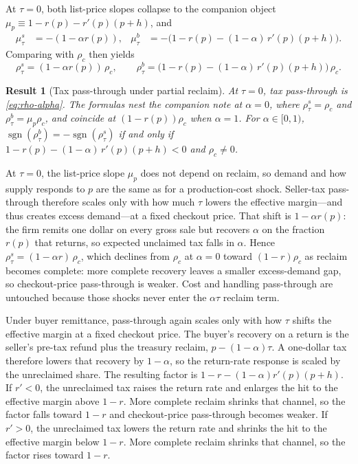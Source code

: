 \documentclass[11pt]{article}
\newtheorem{result}{Result}
\begin{document}
At $\tau=0$, both list-price slopes collapse to the companion object
$\mu_p\equiv 1-r(p)-r'(p)(p+h)$, and
\begin{align}
  \mu^{s}_{\tau}
  &= -(1-\alpha r(p)),
  &
  \mu^{b}_{\tau}
  &= -\bigl(1-r(p)-(1-\alpha)\,r'(p)(p+h)\bigr).
  \label{eq:mu-tau-alpha}
\end{align}
Comparing with $\rho_c$ then yields
\begin{equation}
  \rho^{s}_{\tau}
  = (1-\alpha r(p))\,\rho_c,
  \qquad
  \rho^{b}_{\tau}
  = \bigl(1-r(p)-(1-\alpha)\,r'(p)(p+h)\bigr)\,\rho_c.
  \label{eq:rho-alpha}
\end{equation}
\begin{result}[Tax pass-through under partial reclaim]
\label{res:rho-alpha}
  At $\tau=0$, tax pass-through is \eqref{eq:rho-alpha}.  The formulas nest the
  companion note at $\alpha=0$, where $\rho^{s}_{\tau}=\rho_c$ and
  $\rho^{b}_{\tau}=\mu_p\rho_c$, and coincide at $(1-r(p))\rho_c$ when
  $\alpha=1$.  For $\alpha\in[0,1)$,
  $\operatorname{sgn}(\rho^{b}_{\tau})=-\operatorname{sgn}(\rho^{s}_{\tau})$
  if and only if $1-r(p)-(1-\alpha)\,r'(p)(p+h)<0$ and $\rho_c\neq 0$.
\end{result}
At $\tau=0$, the list-price slope $\mu_p$ does not depend on reclaim, so
demand and how supply responds to $p$ are the same as for a production-cost
shock.  Seller-tax pass-through therefore scales only with how much $\tau$
lowers the effective margin---and thus creates excess demand---at a fixed
checkout price.  That shift is $1-\alpha r(p)$: the firm remits one dollar on
every gross sale but recovers $\alpha$ on the fraction $r(p)$ that returns, so
expected unclaimed tax falls in $\alpha$.  Hence
$\rho^{s}_{\tau}=(1-\alpha r)\,\rho_c$, which declines from $\rho_c$ at
$\alpha=0$ toward $(1-r)\rho_c$ as reclaim becomes complete: more complete
recovery leaves a smaller excess-demand gap, so checkout-price pass-through is
weaker.  Cost and handling pass-through are untouched because those shocks
never enter the $\alpha\tau$ reclaim term.

Under buyer remittance, pass-through again scales only with how $\tau$
shifts the effective margin at a fixed checkout price.  The buyer's recovery
on a return is the seller's pre-tax refund plus the treasury reclaim,
$p-(1-\alpha)\tau$.  A one-dollar tax therefore lowers that recovery by
$1-\alpha$, so the return-rate response is scaled by the unreclaimed share.
The resulting factor is $1-r-(1-\alpha)r'(p)(p+h)$.
If $r'<0$, the unreclaimed tax raises the return rate and enlarges the hit to
the effective margin above $1-r$.  More complete reclaim shrinks that channel,
so the factor falls toward $1-r$ and checkout-price pass-through becomes
weaker.
If $r'>0$, the unreclaimed tax lowers the return rate and shrinks the hit to
the effective margin below $1-r$.  More complete reclaim shrinks that channel,
so the factor rises toward $1-r$.
\end{document}
